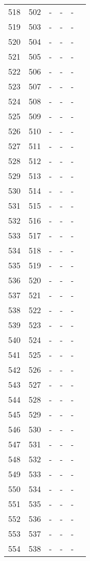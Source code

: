 \documentclass[10pt]{article}
\begin{document}
\begin{longtable}{llllll}
  518 & 502 & - & - & - &  \\ 
  519 & 503 & - & - & - &  \\ 
  520 & 504 & - & - & - &  \\ 
  521 & 505 & - & - & - &  \\ 
  522 & 506 & - & - & - &  \\ 
  523 & 507 & - & - & - &  \\ 
  524 & 508 & - & - & - &  \\ 
  525 & 509 & - & - & - &  \\ 
  526 & 510 & - & - & - &  \\ 
  527 & 511 & - & - & - &  \\ 
  528 & 512 & - & - & - &  \\ 
  529 & 513 & - & - & - &  \\ 
  530 & 514 & - & - & - &  \\ 
  531 & 515 & - & - & - &  \\ 
  532 & 516 & - & - & - &  \\ 
  533 & 517 & - & - & - &  \\ 
  534 & 518 & - & - & - &  \\ 
  535 & 519 & - & - & - &  \\ 
  536 & 520 & - & - & - &  \\ 
  537 & 521 & - & - & - &  \\ 
  538 & 522 & - & - & - &  \\ 
  539 & 523 & - & - & - &  \\ 
  540 & 524 & - & - & - &  \\ 
  541 & 525 & - & - & - &  \\ 
  542 & 526 & - & - & - &  \\ 
  543 & 527 & - & - & - &  \\ 
  544 & 528 & - & - & - &  \\ 
  545 & 529 & - & - & - &  \\ 
  546 & 530 & - & - & - &  \\ 
  547 & 531 & - & - & - &  \\ 
  548 & 532 & - & - & - &  \\ 
  549 & 533 & - & - & - &  \\ 
  550 & 534 & - & - & - &  \\ 
  551 & 535 & - & - & - &  \\ 
  552 & 536 & - & - & - &  \\ 
  553 & 537 & - & - & - &  \\ 
  554 & 538 & - & - & - &  \\ 

\end{longtable}
\end{document}
